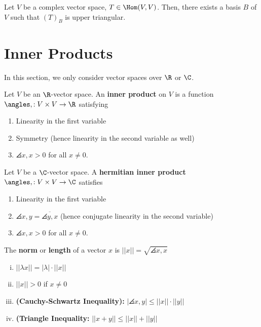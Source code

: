 \begin{thm}
    Let $V$ be a complex vector space, $T \in \Hom(V,V)$. Then, there exists a basis $B$ of $V$ such that $(T)_B$ is upper triangular.
\end{thm}

\section{Inner Products}
In this section, we only consider vector spaces over $\R$ or $\C$.
\begin{defn}
    Let $V$ be an $\R$-vector space. An \textbf{inner product} on $V$ is a function $\angles ,:V \times V \to \R$ satisfying
    \begin{enumerate}
        \item[(i)] Linearity in the first variable
        \item[(ii)] Symmetry (hence linearity in the second variable as well)
        \item[(iii)] $\angles{x,x}>0$ for all $x \neq 0$.
    \end{enumerate}
\end{defn}

\begin{defn}
    Let $V$ be a $\C$-vector space. A \textbf{hermitian inner product} $\angles,:V \times V \to \C$ satisfies
    \begin{enumerate}
        \item[(i)] Linearity in the first variable
        \item[(ii)] $\angles{x,y}= \overline{\angles{y,x}}$ (hence conjugate linearity in the second variable)
        \item[(iii)] $\angles{x,x}>0$ for all $x \neq 0$.
    \end{enumerate}
\end{defn}

\begin{defn}
    The \textbf{norm} or \textbf{length} of a vector $x$ is $||x|| = \sqrt{\angles{x,x}}$
\end{defn}

\begin{prop}
    \begin{enumerate}[(i)]
        \item $||\lambda x|| = |\lambda | \cdot ||x||$
        \item $||x|| > 0$ if $x \neq 0$
        \item \textbf{(Cauchy-Schwartz Inequality):} $|\angles{x,y}| \leq ||x|| \cdot ||y||$
        \item \textbf{(Triangle Inequality:} $||x+y|| \leq ||x|| + ||y||$
    \end{enumerate}
\end{prop}

